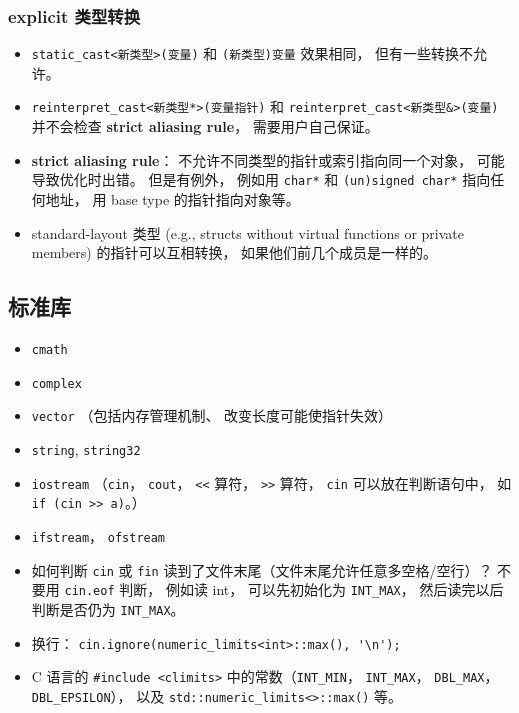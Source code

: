 \subsubsection{explicit 类型转换}
\begin{itemize}
\item \verb|static_cast<新类型>(变量)| 和 \verb|(新类型)变量| 效果相同， 但有一些转换不允许。
\item \verb|reinterpret_cast<新类型*>(变量指针)| 和 \verb|reinterpret_cast<新类型&>(变量)| 并不会检查 \textbf{strict aliasing rule}， 需要用户自己保证。
\item \textbf{strict aliasing rule}： 不允许不同类型的指针或索引指向同一个对象， 可能导致优化时出错。 但是有例外， 例如用 \verb|char*| 和 \verb|(un)signed char*| 指向任何地址， 用 base type 的指针指向对象等。
\item standard-layout 类型 (e.g., structs without virtual functions or private members) 的指针可以互相转换， 如果他们前几个成员是一样的。
\end{itemize}

\subsection{标准库}
\begin{itemize}
\item \verb|cmath|
\item \verb|complex|
\item \verb|vector| （包括内存管理机制、 改变长度可能使指针失效）
\item \verb|string|, \verb|string32|
\item \verb|iostream| （\verb|cin|， \verb|cout|， \verb|<<| 算符， \verb|>>| 算符， \verb|cin| 可以放在判断语句中， 如 \verb|if (cin >> a)|。）
\item \verb|ifstream|， \verb|ofstream|
\item 如何判断 \verb|cin| 或 \verb|fin| 读到了文件末尾（文件末尾允许任意多空格/空行）？ 不要用 \verb|cin.eof| 判断， 例如读 int， 可以先初始化为 \verb|INT_MAX|， 然后读完以后判断是否仍为 \verb|INT_MAX|。
\item 换行： \verb|cin.ignore(numeric_limits<int>::max(), '\n');|
\item C 语言的 \verb|#include <climits>| 中的常数（\verb|INT_MIN|， \verb|INT_MAX|， \verb|DBL_MAX|， \verb|DBL_EPSILON|）， 以及 \verb|std::numeric_limits<>::max()| 等。
\end{itemize}

